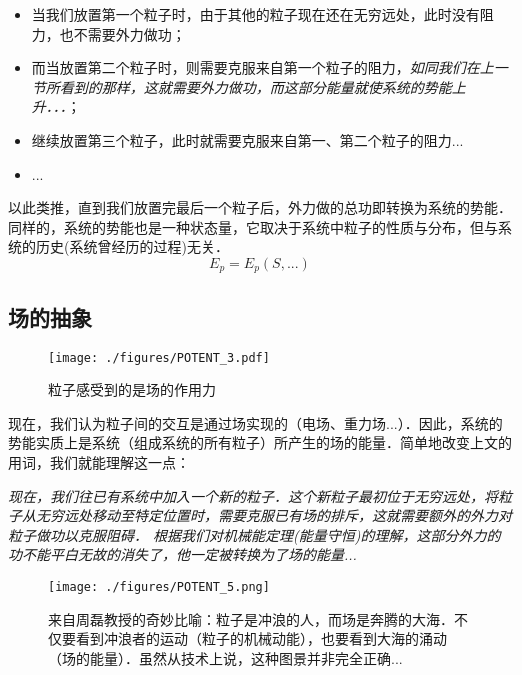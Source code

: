 \begin{itemize}
\item 当我们放置第一个粒子时，由于其他的粒子现在还在无穷远处，此时没有阻力，也不需要外力做功；
\item 而当放置第二个粒子时，则需要克服来自第一个粒子的阻力，\textsl{如同我们在上一节所看到的那样，这就需要外力做功，而这部分能量就使系统的势能上升．．．}；
\item 继续放置第三个粒子，此时就需要克服来自第一、第二个粒子的阻力...
\item ...
\end{itemize}
以此类推，直到我们放置完最后一个粒子后，外力做的总功即转换为系统的势能．
同样的，系统的势能也是一种状态量，它取决于系统中粒子的性质与分布，但与系统的历史(系统曾经历的过程)无关．
$$E_p=E_p(S,...)$$

\subsection{场的抽象}
\begin{figure}[ht]
\centering
\texttt{[image: ./figures/POTENT\_3.pdf]}
\caption{粒子感受到的是场的作用力} \label{POTENT_fig3}
\end{figure}
现在，我们认为粒子间的交互是通过场实现的（电场、重力场...）．因此，系统的势能实质上是系统（组成系统的所有粒子）所产生的场的能量．简单地改变上文的用词，我们就能理解这一点：

\textsl{现在，我们往已有系统中加入一个新的粒子．这个新粒子最初位于无穷远处，将粒子从无穷远处移动至特定位置时，需要克服已有场的排斥，这就需要额外的外力对粒子做功以克服阻碍． 根据我们对机械能定理(能量守恒)的理解，这部分外力的功不能平白无故的消失了，他一定被转换为了场的能量...}

\begin{figure}[ht]
\centering
\texttt{[image: ./figures/POTENT\_5.png]}
\caption{来自周磊教授的奇妙比喻：粒子是冲浪的人，而场是奔腾的大海．不仅要看到冲浪者的运动（粒子的机械动能），也要看到大海的涌动（场的能量）．虽然从技术上说，这种图景并非完全正确...} \label{POTENT_fig5}
\end{figure}
